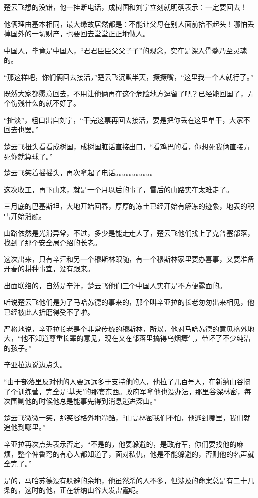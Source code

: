 楚云飞想的没错，他一挂断电话，成树国和刘宁立刻就明确表示：一定要回去！

他俩理由基本相同，最大缘故居然都是：不能让父母在别人面前抬不起头！哪怕丢掉国外的一切财产，也要回去堂堂正正地做人。

中国人，毕竟是中国人，“君君臣臣父父子子”的观念，实在是深入骨髓乃至灵魂的。

“那这样吧，你们俩回去接活，”楚云飞沉默半天，撅撅嘴，“这里我一个人就行了。”

既然大家都愿意回去，不用让他俩再在这个危险地方逗留了吧？已经能回国了，弄个伤残什么的就不好了。

“扯淡”，粗口出自刘宁，“干完这票再回去接活，要是把你丢在这里单干，大家不回去也罢。”

楚云飞扭头看看成树国，成树国脏话直接出口，“看鸡巴的看，你想死我俩直接弄死你就算球了。”

楚云飞笑着摇摇头，再次拿起了电话。。。。。。。。。。。

这次收工，再下山来，就是一个月以后的事了，雪后的山路实在太难走了。

三月底的巴基斯坦，大地开始回春，厚厚的冻土已经开始有解冻的迹象，地表的积雪开始消融。

山路依然是光滑异常，不过，多少是能走走人了，楚云飞他们找上了克普塞部落，找到了那个安全局介绍的长老。

这次出来，只有辛汗和另一个穆斯林跟随，有一个穆斯林家里要办喜事，又要准备开春的耕种事宜，没有跟来。

出面联络的，自然是辛汗，楚云飞他们三个中国人实在是不方便露面的。

听说楚云飞他们是为了马哈苏德的事来的，那个叫辛亚拉的长老匆匆出来相见，他已经被此人折磨得受不了啦。

严格地说，辛亚拉长老是个非常传统的穆斯林，所以，他对马哈苏德的意见格外地大，“他不知道尊重长辈的意见，现在又在部落里搞得乌烟瘴气，带坏了不少纯洁的孩子。”

辛亚拉边说边点头。

“由于部落里反对他的人要远远多于支持他的人，他拉了几百号人，在新纳山谷搞了个训练营，完全是‘基天’的那套东西。政府军拿他也没办法，那里谷深林密，每次围剿他的时候他总是能事先得到消息逃进深山。”

楚云飞微微一笑，那笑容格外地冷酷，“山高林密我们不怕，他逃到哪里，我们就追他到哪里。”

辛亚拉再次点头表示否定，“不是的，他要躲避的，是政府军，你们要找他的麻烦，整个俾鲁弯的有心人都知道了，面对私仇，他是不能躲避的，否则他的名声就全完了。”

是的，马哈苏德没有躲避的余地，他虽然杀的人不多，但涉及的命案总是有二十几条的，这时的他，正在新纳山谷大发雷霆呢。

